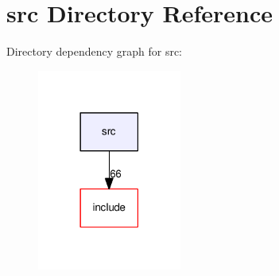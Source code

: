 \section{src Directory Reference}
\label{dir_aed8e593582c3cc8bd5e6abe9c12379f}
Directory dependency graph for src\-:\nopagebreak
\begin{figure}[H]
\begin{center}
\leavevmode
\includegraphics[width=134pt]{dir_aed8e593582c3cc8bd5e6abe9c12379f_dep}
\end{center}
\end{figure}
